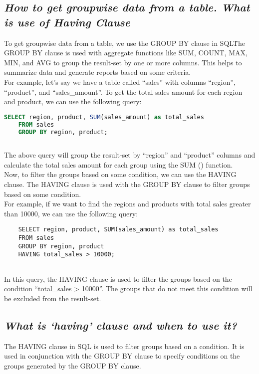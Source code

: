 \documentclass{article}
\begin{document}
\subsection{\textit{How to get groupwise data from a table. What is use of Having Clause}}
To get groupwise data from a table, we use the GROUP BY clause in SQL\. The GROUP BY clause is used with aggregate functions like SUM, COUNT, MAX, MIN, and AVG to group the result-set by one or more columns. This helps to summarize data and generate reports based on some criteria.\\

For example, let's say we have a table called ``sales'' with columns ``region'', ``product'', and ``sales\_amount''. To get the total sales amount for each region and product, we can use the following query:
\begin{lstlisting}[language=SQL]
    SELECT region, product, SUM(sales_amount) as total_sales
    FROM sales
    GROUP BY region, product;
    
\end{lstlisting}
The above query will group the result-set by ``region'' and ``product'' columns and calculate the total sales amount for each group using the SUM () function.\\

Now, to filter the groups based on some condition, we can use the HAVING clause. The HAVING clause is used with the GROUP BY clause to filter groups based on some condition.\\

For example, if we want to find the regions and products with total sales greater than 10000, we can use the following query:
\begin{lstlisting}
    SELECT region, product, SUM(sales_amount) as total_sales
    FROM sales
    GROUP BY region, product
    HAVING total_sales > 10000;
    
\end{lstlisting}
In this query, the HAVING clause is used to filter the groups based on the condition ``total\_sales > 10000''. The groups that do not meet this condition will be excluded from the result-set.

\subsection{\textit{What is ‘having’ clause and when to use it?}}
The HAVING clause in SQL is used to filter groups based on a condition. It is used in conjunction with the GROUP BY clause to specify conditions on the groups generated by the GROUP BY clause.\\
\end{document}

